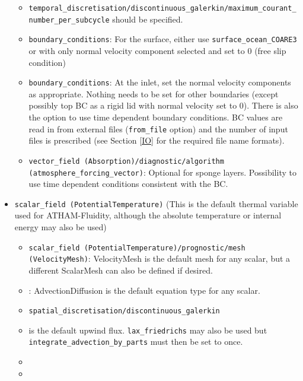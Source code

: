 \documentclass[10pt,a4paper]{article}
\begin{document}
\begin{itemize}
\begin{itemize}
\item \texttt{temporal\_discretisation/discontinuous\_galerkin/maximum\_courant\_number\_per\_subcycle} should be specified.
\item \texttt{boundary\_conditions}: For the surface, either use \texttt{surface\_ocean\_COARE3} or \texttt{} with only normal velocity component selected and set to 0 (free slip condition)
\item \texttt{boundary\_conditions}: At the inlet, set the normal velocity components as appropriate. Nothing needs to be set for other boundaries (except possibly top BC as a rigid lid with normal velocity set to 0). There is also the option to use time dependent boundary conditions. BC values are read in from external files (\texttt{from\_file} option) and the number of input files is prescribed (see Section \ref{IO} for the required file name formats).
\item \texttt{vector\_field (Absorption)/diagnostic/algorithm (atmosphere\_forcing\_vector)}: Optional for sponge layers. Possibility to use time dependent conditions consistent with the BC.
\end{itemize}
\item \texttt{scalar\_field (PotentialTemperature)} (This is the default thermal variable used for ATHAM-Fluidity, although the absolute temperature or internal energy may also be used)
\begin{itemize}
\item \texttt{scalar\_field (PotentialTemperature)/prognostic/mesh (VelocityMesh)}: VelocityMesh is the default mesh for any scalar, but a different ScalarMesh can also be defined if desired.
\item \texttt{}: AdvectionDiffusion is the default equation type for any scalar.
\item \texttt{spatial\_discretisation/discontinuous\_galerkin}
\item \texttt{} is the default upwind flux. \texttt{lax\_friedrichs} may also be used but \texttt{integrate\_advection\_by\_parts} must then be set to once.
\item \texttt{}
\item \texttt{}

\end{itemize}
\end{itemize}
\end{document}

